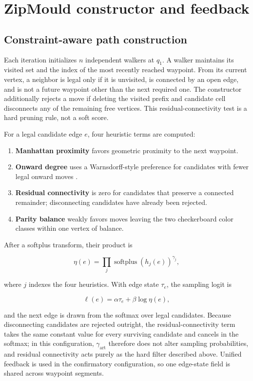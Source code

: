 \documentclass[pdflatex,sn-basic,iicol]{sn-jnl}
\begin{document}
\section{ZipMould constructor and feedback}

\subsection{Constraint-aware path construction}

Each iteration initializes $n$ independent walkers at $q_1$. A walker maintains its visited set and the index of the most recently reached waypoint. From its current vertex, a neighbor is legal only if it is unvisited, is connected by an open edge, and is not a future waypoint other than the next required one. The constructor additionally rejects a move if deleting the visited prefix and candidate cell disconnects any of the remaining free vertices. This residual-connectivity test is a hard pruning rule, not a soft score.

For a legal candidate edge $e$, four heuristic terms are computed:

\begin{enumerate}
\item \textbf{Manhattan proximity} favors geometric proximity to the next waypoint.
\item \textbf{Onward degree} uses a Warnsdorff-style preference for candidates with fewer legal onward moves \citep{pohl1967warnsdorff}.
\item \textbf{Residual connectivity} is zero for candidates that preserve a connected remainder; disconnecting candidates have already been rejected.
\item \textbf{Parity balance} weakly favors moves leaving the two checkerboard color classes within one vertex of balance.
\end{enumerate}

After a softplus transform, their product is

\begin{equation}
\eta(e)=\prod_j\operatorname{softplus}(h_j(e))^{\gamma_j},
\end{equation}

where $j$ indexes the four heuristics. With edge state $\tau_e$, the sampling logit is

\begin{equation}
\ell(e)=\alpha\tau_e+\beta\log\eta(e),
\end{equation}

and the next edge is drawn from the softmax over legal candidates. Because disconnecting candidates are rejected outright, the residual-connectivity term takes the same constant value for every surviving candidate and cancels in the softmax; in this configuration, $\gamma_{\mathrm{art}}$ therefore does not alter sampling probabilities, and residual connectivity acts purely as the hard filter described above. Unified feedback is used in the confirmatory configuration, so one edge-state field is shared across waypoint segments.
\end{document}
